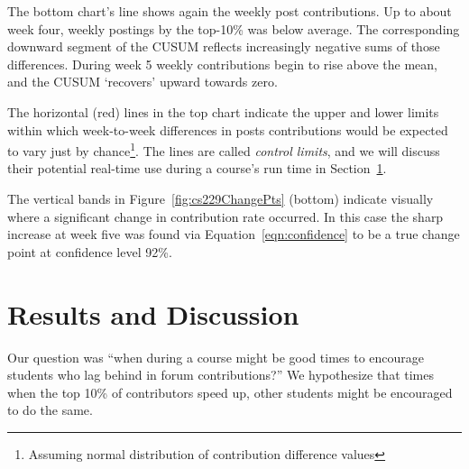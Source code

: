 The bottom chart's line shows again the weekly post contributions.
Up to about week four, weekly postings by the top-10\% was below
average. The corresponding downward segment of the CUSUM reflects
increasingly negative sums of those differences. During week 5 weekly
contributions begin to rise above the mean, and the CUSUM `recovers'
upward towards zero.

The horizontal (red) lines in the top chart indicate the upper and
lower limits within which week-to-week differences in posts
contributions would be expected to vary just by
chance\footnote{Assuming normal distribution of contribution
  difference values}. The lines are called {\em control limits}, and
we will discuss their potential real-time use during a course's run
time in Section~\ref{sec:discussion}.

The vertical bands in Figure~\ref{fig:cs229ChangePts} (bottom)
indicate visually where a significant change in contribution rate
occurred. In this case the sharp increase at week five was found via
Equation~\ref{eqn:confidence} to be a true change point at confidence
level 92\%.

\section{Results and Discussion}
\label{sec:discussion}

Our question was ``when during a course might be good times to
encourage students who lag behind in forum contributions?'' We
hypothesize that times when the top 10\% of contributors speed up,
other students might be encouraged to do the same.

